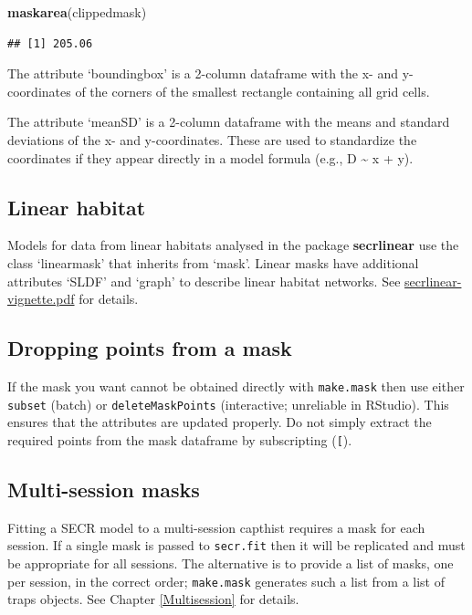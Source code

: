 \documentclass[
]{book}
\newenvironment{Shaded}{\begin{snugshade}}{\end{snugshade}}
\newcommand{\FunctionTok}[1]{\textcolor[rgb]{0.13,0.29,0.53}{\textbf{#1}}}
\newcommand{\NormalTok}[1]{#1}
\begin{document}
\begin{Shaded}
\begin{Highlighting}[]
\FunctionTok{maskarea}\NormalTok{(clippedmask)}
\end{Highlighting}
\end{Shaded}

\begin{verbatim}
## [1] 205.06
\end{verbatim}

The attribute `boundingbox' is a 2-column dataframe with the x- and y-coordinates of the corners of the smallest rectangle containing all grid cells.

The attribute `meanSD' is a 2-column dataframe with the means and standard deviations of the x- and y-coordinates. These are used to standardize the coordinates if they appear directly in a model formula (e.g., D \textasciitilde{} x + y).

\subsection{Linear habitat}\label{linear-habitat}

Models for data from linear habitats analysed in the package \textbf{secrlinear} \citep{R-secrlinear} use the class `linearmask' that inherits from `mask'. Linear masks have additional attributes `SLDF' and `graph' to describe linear habitat networks. See \href{https://CRAN.R-project.org/package=secrlinear/vignettes/secrlinear-vignette.pdf}{secrlinear-vignette.pdf} for details.

\subsection{Dropping points from a mask}\label{dropping-points-from-a-mask}

If the mask you want cannot be obtained directly with \texttt{make.mask} then use either \texttt{subset} (batch) or \texttt{deleteMaskPoints} (interactive; unreliable in RStudio). This ensures that the attributes are updated properly. Do not simply extract the required points from the mask dataframe by subscripting (\texttt{{[}}).

\subsection{Multi-session masks}\label{multi-session-masks}

Fitting a SECR model to a multi-session capthist requires a mask for each session. If a single mask is passed to \texttt{secr.fit} then it will be replicated and must be appropriate for all sessions. The alternative is to provide a list of masks, one per session, in the correct order; \texttt{make.mask} generates such a list from a list of traps objects. See Chapter \ref{Multisession} for details.
\end{document}
